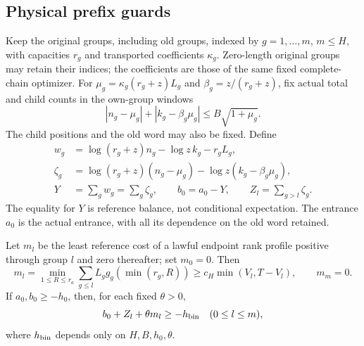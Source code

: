 \subsection{Physical prefix guards}
\label{paper:ep-prefix-guards}
Keep the original groups, including old groups, indexed by $g=1,\ldots,m$,
$m\leq H$, with capacities $r_g$ and transported coefficients
$\kappa_g$.  Zero-length original groups may retain their indices;
the coefficients are those of the same fixed complete-chain optimizer.
For $\mu_g=\kappa_g(r_g+z)L_g$ and $\beta_g=z/(r_g+z)$, fix actual
total and child counts in the own-group windows
\begin{equation}\label{paper:ep-own-central}
 |n_g-\mu_g|+|k_g-\beta_g\mu_g|\leq B\sqrt{1+\mu_g}.
\end{equation}
The child positions and the old word may also be fixed.  Define
\begin{align}
 w_g&=\log(r_g+z)n_g-\log z\,k_g-r_gL_g,\nonumber\\
 \zeta_g&=\log(r_g+z)(n_g-\mu_g)
                   -\log z(k_g-\beta_g\mu_g),\nonumber\\
 Y&=\sum_gw_g=\sum_g\zeta_g,\qquad b_0=a_0-Y,
       \qquad Z_l=\sum_{g>l}\zeta_g.\label{paper:ep-binary-remainder}
\end{align}
The equality for $Y$ is reference balance, not conditional expectation.
The entrance $a_0$ is the actual entrance, with all its dependence on
the old word retained.
\begin{lemma}\label{paper:ep-clipped-prefix}
Let $m_l$ be the least reference cost of a lawful endpoint rank profile
positive through group $l$ and zero thereafter; set $m_0=0$.
Then
\begin{equation}\label{paper:ep-clipped-formula}
 m_l=\min_{1\leq R\leq r_a}
       \sum_{g\leq l}L_gg_g(\min(r_g,R))
       \geq c_H\min(V_l,T-V_l),\qquad m_m=0.
\end{equation}
If $a_0,b_0\geq-h_0$, then, for each fixed $\theta>0$,
\begin{equation}\label{paper:ep-guard}
 b_0+Z_l+\theta m_l\geq-h_{\rm bin}\quad(0\leq l\leq m),
\end{equation}
where $h_{\rm bin}$ depends only on $H,B,h_0,\theta$.
\end{lemma}
